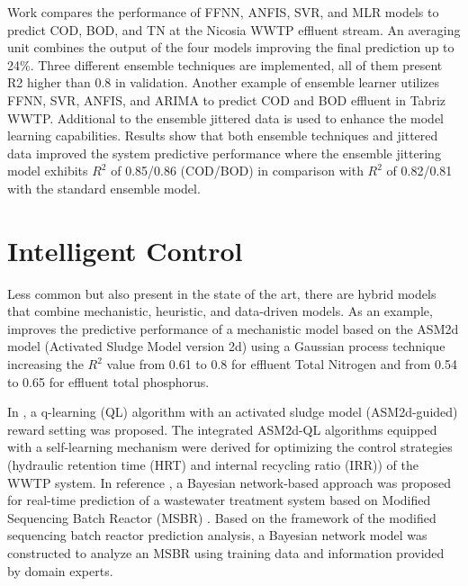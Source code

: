 Work \cite{Nourani2018} compares the performance of FFNN, ANFIS, SVR, and MLR models to predict \ac{COD}, BOD, and TN at the Nicosia WWTP effluent stream. An averaging unit combines the output of the four models improving the final prediction up to 24\%. Three different ensemble techniques are implemented, all of them present R2 higher than 0.8 in validation. Another example of ensemble learner \cite{Nourani2021} utilizes FFNN, SVR, ANFIS, and ARIMA to predict \ac{COD} and BOD effluent in Tabriz WWTP. Additional to the ensemble jittered data is used to enhance the model learning capabilities. Results show that both ensemble techniques and jittered data improved the system predictive performance where the ensemble jittering model exhibits \begin{math}R^2\end{math} of 0.85/0.86 (\ac{COD}/BOD) in comparison with \begin{math}R^2\end{math} of 0.82/0.81 with the standard ensemble model.  

\section{Intelligent Control}
\label{s:RelatedWorks-Control}

Less common but also present in the state of the art, there are hybrid models that combine mechanistic, heuristic, and data-driven models. As an example, \cite{Hvala2020} improves the predictive performance of a mechanistic model based on the ASM2d model (Activated Sludge Model version 2d) using a Gaussian process technique increasing the \begin{math}R^2\end{math} value from 0.61 to 0.8 for effluent Total Nitrogen and from 0.54 to 0.65 for effluent total phosphorus.

In \cite{Pang2019}, a q-learning (QL) algorithm with an activated sludge model (ASM2d-guided) reward setting was proposed. The integrated ASM2d-QL algorithms equipped with a self-learning mechanism were derived for optimizing the control strategies (hydraulic retention time (HRT) and internal recycling ratio (IRR)) of the WWTP system. In reference \cite{Li2013}, a Bayesian network-based approach was proposed for real-time prediction of a wastewater treatment system based on Modified Sequencing Batch Reactor (MSBR) . Based on the framework of the modified sequencing batch reactor prediction analysis, a Bayesian network model was constructed to analyze an MSBR using training data and information provided by domain experts.

